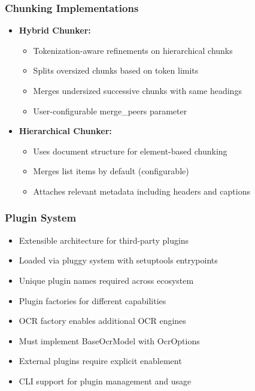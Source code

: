 \begin{frame}[fragile]\frametitle{Chunking Implementations}
      \begin{itemize}
	\item \textbf{Hybrid Chunker:}
	\begin{itemize}
		\item Tokenization-aware refinements on hierarchical chunks
		\item Splits oversized chunks based on token limits
		\item Merges undersized successive chunks with same headings
		\item User-configurable merge\_peers parameter
	\end{itemize}
	\item \textbf{Hierarchical Chunker:}
	\begin{itemize}
		\item Uses document structure for element-based chunking  
		\item Merges list items by default (configurable)
		\item Attaches relevant metadata including headers and captions
	\end{itemize}
	  \end{itemize}
\end{frame}

\begin{frame}[fragile]\frametitle{Plugin System}
      \begin{itemize}
	\item Extensible architecture for third-party plugins
	\item Loaded via pluggy system with setuptools entrypoints
	\item Unique plugin names required across ecosystem
	\item Plugin factories for different capabilities
	\item OCR factory enables additional OCR engines
	\item Must implement BaseOcrModel with OcrOptions
	\item External plugins require explicit enablement
	\item CLI support for plugin management and usage
	  \end{itemize}
\end{frame}

